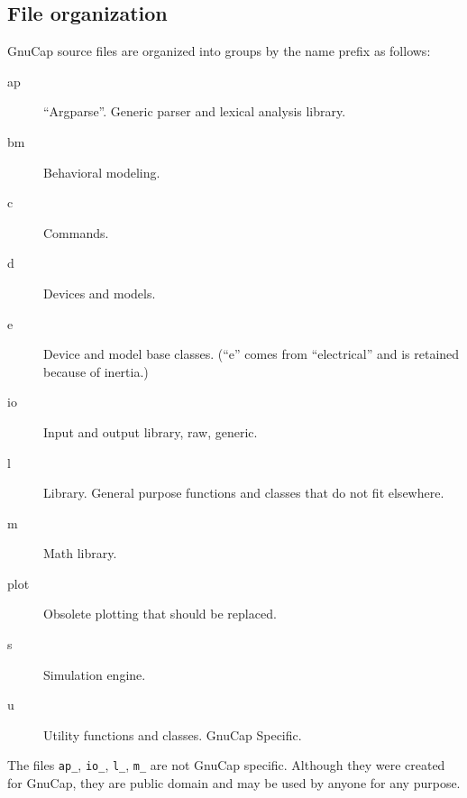 %
%
%
%
\subsection{File organization}

GnuCap source files are organized into groups by the name prefix as follows:

\begin{description}
\item[ap] ``Argparse''.  Generic parser and lexical analysis library.
\item[bm] Behavioral modeling.
\item[c] Commands.
\item[d] Devices and models.
\item[e] Device and model base classes.  (``e'' comes from
  ``electrical'' and is retained because of inertia.)
\item[io] Input and output library, raw, generic.
\item[l] Library.  General purpose functions and classes that do not
  fit elsewhere.
\item[m] Math library.
\item[plot] Obsolete plotting that should be replaced.
\item[s] Simulation engine.
\item[u] Utility functions and classes.  GnuCap Specific.
\end{description}

The files {\tt ap\_\*}, {\tt io\_\*}, {\tt l\_\*}, {\tt m\_\*} are not GnuCap
specific.  Although they were created for GnuCap, they are public domain
and may be used by anyone for any purpose.


